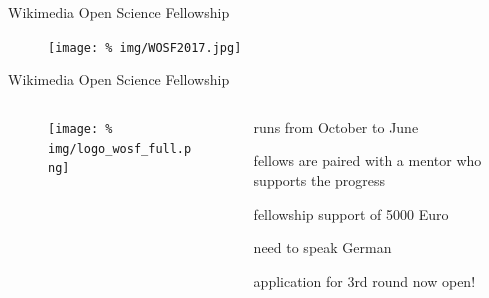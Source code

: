 

\begin{frame}{Wikimedia Open Science Fellowship}

  \begin{figure}
    \centering
    \texttt{[image: \%
    img/WOSF2017.jpg]} %
  \end{figure}
  



\end{frame}




\begin{frame}{Wikimedia Open Science Fellowship}

  \begin{columns}
    \begin{column}{.5\textwidth}


      \begin{figure}
        \centering
        \texttt{[image: \%
        img/logo\_wosf\_full.png]} %
      \end{figure}
      

      
      

    \end{column}
    \begin{column}{.5\textwidth}
      \minipage[c][0.65\textheight][s]{\columnwidth}

      runs from October to June

      \vfill

      fellows are paired with a mentor who supports the progress

      \vfill

      fellowship support of 5000 Euro

      \vfill

      need to speak German

      \vfill
      
      application for 3rd round now open!

      \vfill

      \endminipage      
    \end{column}
  \end{columns}
  
\end{frame}

